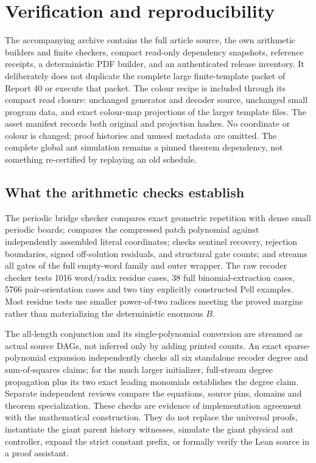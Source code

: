 \documentclass[11pt,letterpaper]{article}
\theoremstyle{definition}\newtheorem{definition}[theorem]{Definition}
\theoremstyle{remark}\newtheorem{remark}[theorem]{Remark}
\begin{document}
\section{Verification and reproducibility}\label{ptr:ai:sec:verification}
The accompanying archive contains the full article source, the own arithmetic builders and finite checkers, compact read-only dependency snapshots, reference receipts, a deterministic PDF builder, and an authenticated release inventory. It deliberately does not duplicate the complete large finite-template packet of Report 40 or execute that packet. The colour recipe is included through its compact read closure: unchanged generator and decoder source, unchanged small program data, and exact colour-map projections of the larger template files. The asset manifest records both original and projection hashes. No coordinate or colour is changed; proof histories and unused metadata are omitted. The complete global ant simulation remains a pinned theorem dependency, not something re-certified by replaying an old schedule.

\subsection{What the arithmetic checks establish}
The periodic bridge checker compares exact geometric repetition with dense small periodic boards; compares the compressed patch polynomial against independently assembled literal coordinates; checks sentinel recovery, rejection boundaries, signed off-solution residuals, and structural gate counts; and streams all gates of the full empty-word family and outer wrapper. The raw recoder checker tests 1016 word/radix residue cases, 38 full binomial-extraction cases, 5766 pair-orientation cases and two tiny explicitly constructed Pell examples. Most residue tests use smaller power-of-two radices meeting the proved margins rather than materializing the deterministic enormous $B$.

The all-length conjunction and its single-polynomial conversion are streamed as actual source DAGs, not inferred only by adding printed counts. An exact sparse-polynomial expansion independently checks all six standalone recoder degree and sum-of-squares claims; for the much larger initializer, full-stream degree propagation plus its two exact leading monomials establishes the degree claim. Separate independent reviews compare the equations, source pins, domains and theorem specialization. These checks are evidence of implementation agreement with the mathematical construction. They do not replace the universal proofs, instantiate the giant parent history witnesses, simulate the giant physical ant controller, expand the strict constant prefix, or formally verify the Lean source in a proof assistant.
\end{document}
